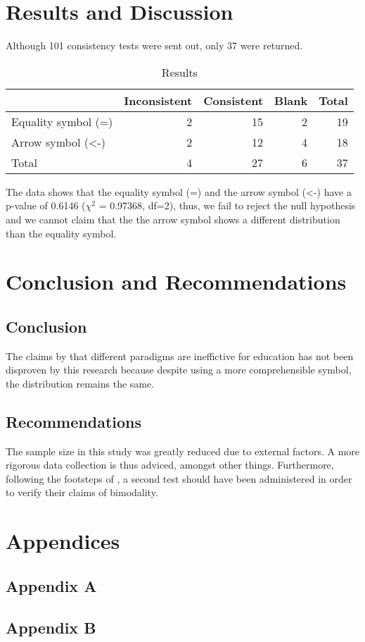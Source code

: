 \documentclass[12pt]{article}
\begin{document}
\section{Results and Discussion}
\label{sec:orga110f93}
Although 101 consistency tests were sent out, only 37 were returned.

\begin{table}[htbp]
\caption{\label{tab:org4e7ea70}
Results}
\centering
\begin{tabular}{lrrrr}
 & Inconsistent & Consistent & Blank & Total\\
\hline
Equality symbol (=) & 2 & 15 & 2 & 19\\
Arrow symbol (<-) & 2 & 12 & 4 & 18\\
Total & 4 & 27 & 6 & 37\\
\end{tabular}
\end{table}

The data shows that the equality symbol (=) and the arrow symbol (<-) have a p-value of 0.6146 (\(\chi^{\text{2}}\) = 0.97368,  df=2),
thus, we fail to reject the null hypothesis and
we cannot claim that the the arrow symbol shows a different distribution than the equality symbol.

\section{Conclusion and Recommendations}
\label{sec:org7d9c94a}

\subsection{Conclusion}
\label{sec:orgf6bf92e}
The claims by \cite{dehnadi2006camel} that different paradigms are ineffictive for education has not been disproven by this research because
despite using a more comprehensible symbol, the distribution remains the same.

\subsection{Recommendations}
\label{sec:orgbff1e7f}
The sample size in this study was greatly reduced due to external factors. 
A more rigorous data collection is thus adviced, amongst other things.
Furthermore, following the footsteps of \cite{dehnadi2006camel}, 
a second test should have been administered in order to 
verify their claims of bimodality.

\raggedright



\section{Appendices}
\label{sec:orgdac546c}
\subsection{Appendix A}
\label{sec:org6a8f1f8}


\subsection{Appendix B}
\label{sec:org8500dc1}

\end{document}
